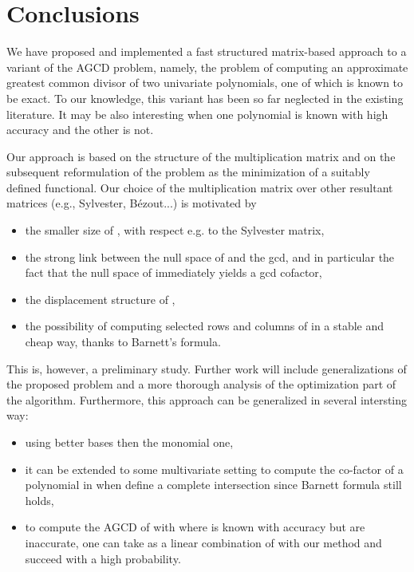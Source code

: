 \documentclass{article}
\newenvironment{itemizedot}{\begin{itemize} \renewcommand{\labelitemi}{}\renewcommand{\labelitemii}{}\renewcommand{\labelitemiii}{}\renewcommand{\labelitemiv}{}}{\end{itemize}}
\begin{document}
\section{Conclusions}



We have proposed and implemented a fast structured matrix-based approach to a
variant of the AGCD problem, namely, the problem of computing an approximate
greatest common divisor of two univariate polynomials, one of which is known
to be exact. To our knowledge, this variant has been so far neglected in the
existing literature. It may be also interesting when one polynomial is known
with high accuracy and the other is not.

Our approach is based on the structure of the multiplication matrix and on
the subsequent reformulation of the problem as the minimization of a suitably
defined functional. Our choice of the multiplication matrix  over other
resultant matrices (e.g., Sylvester, B\'ezout...) is motivated by
\begin{itemizedot}
  \item the smaller size of , with respect e.g. to the Sylvester matrix,
  
  \item the strong link between the null space of  and the gcd, and in
  particular the fact that the null space of  immediately yields a gcd
  cofactor,
  
  \item the displacement structure of ,
  
  \item the possibility of computing selected rows and columns of  in a
  stable and cheap way, thanks to Barnett's formula.
\end{itemizedot}
This is, however, a preliminary study. Further work will include
generalizations of the proposed problem and a more thorough analysis of the
optimization part of the algorithm. Furthermore, this approach can be
generalized in several intersting way:
\begin{itemizedot}
  \item using better bases then the monomial one,
  
  \item it can be extended to some multivariate setting to compute the
  co-factor of a polynomial  in  when  define a complete intersection since
  Barnett formula still holds,
  
  \item to compute the AGCD of  with  where  is known
  with accuracy but  are inaccurate, one can take  as a
  linear combination of  with our method and succeed with a
  high probability.
\end{itemizedot}
\end{document}
